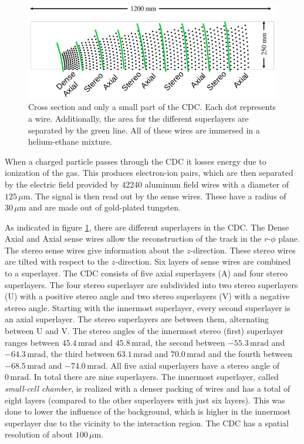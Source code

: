 \documentclass[a4paper,11pt,twosided,final,german,openbib,pdftex,listof=totoc,bibliography=totoc]{scrbook}
\begin{document}
\begin{figure}[h!] 
	\centering
	\includegraphics[width=\textwidth]{Bilder/CDC}
	\caption[Central Drift Chamber]{Cross section and only a small part of the CDC. Each dot represents a wire. Additionally, the area for the different superlayers are separated by the green line. All of these wires are immersed in a helium-ethane mixture.\cite{CDCHauth}}
	\label{fig:CDC}
\end{figure}

When a charged particle passes through the CDC it losses energy due to ionization of the gas. This produces electron-ion pairs, which are then separated by the electric field provided by 42240 aluminum field wires with a diameter of $125\,\mu\textrm{m}$. The signal is then read out by the sense wires. These have a radius of $30\,\mu\textrm{m}$ and are made out of gold-plated tungsten.\cite{B2TR} 

As indicated in figure \ref{fig:CDC}, there are different superlayers in the CDC. The Dense Axial and Axial sense wires allow the reconstruction of the track in the $r$-$\phi$ plane. The stereo sense wires give information about the $z$-direction. These stereo wires are tilted with respect to the $z$-direction. Six layers of sense wires are combined to a superlayer. The CDC consists of five axial superlayers (A) and four stereo superlayers. The four stereo superlayer are subdivided into two stereo superlayers (U) with a positive stereo angle and two stereo superlayers (V) with a negative stereo angle. Starting with the innermost superlayer, every second superlayer is an axial superlayer. The stereo superlayers are between them, alternating between U and V. The stereo angles of the innermost stereo (first) superlayer ranges between $45.4\,\textrm{mrad}$ and $45.8\,\textrm{mrad}$, the second between $-55.3\,\textrm{mrad}$ and $-64.3\,\textrm{mrad}$, the third between $63.1\,\textrm{mrad}$ and $70.0\,\textrm{mrad}$ and the fourth between $-68.5\,\textrm{mrad}$ and $-74.0\,\textrm{mrad}$. 
All five axial superlayers have a stereo angle of $0\,\textrm{mrad}$.
In total there are nine superlayers. The innermost superlayer, called \textit{small-cell chamber}, is realized with a denser packing of wires and has a total of eight layers (compared to the other superlayers with just six layers). This was done to lower the influence of the background, which is higher in the innermost superlayer due to the vicinity to the interaction region.
The CDC has a spatial resolution of about $100\,\mu\textrm{m}$.\cite{B2TR}
\end{document}
